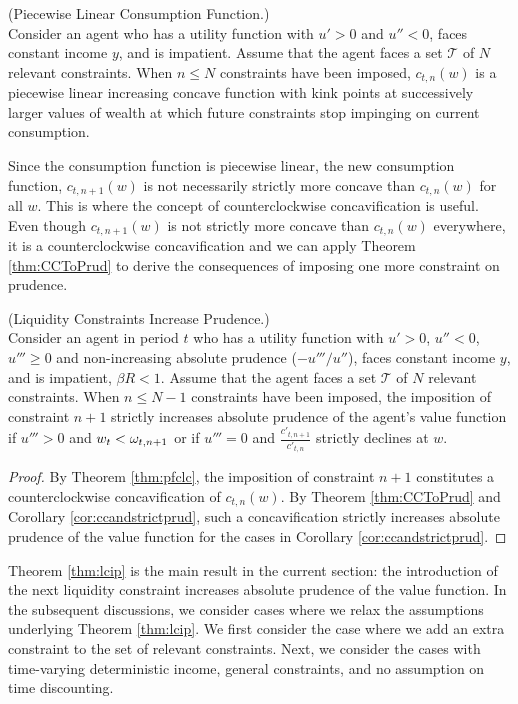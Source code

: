 \begin{corollary}(Piecewise Linear Consumption Function.) \\
	Consider an agent who has a utility function with $u'> 0$ and $u'' < 0$, faces constant income ${y}$, and is impatient. Assume that the agent faces a set $\mathcal{T}$ of $N$ relevant constraints. When $n \leq N$ constraints have been imposed, $c_{t,n}(w)$ is a piecewise linear increasing concave function with kink points at successively larger values of wealth at which future constraints stop impinging on current consumption.
\end{corollary}

Since the consumption function is piecewise linear, the new consumption function, $c_{t,n+1}(w)$ is not necessarily strictly more concave than $c_{t,n}(w)$ for all $w$. This is where the concept of counterclockwise concavification is useful. Even though $c_{t,n+1}(w)$ is not strictly more concave than $c_{t,n}(w)$ everywhere, it is a counterclockwise concavification and we can apply Theorem \ref{thm:CCToPrud} to derive the consequences of imposing one more constraint on prudence.

\begin{theorem}\label{thm:lcip} (Liquidity Constraints Increase Prudence.) \\
	Consider an agent in period $t$ who has a utility function with $u' > 0$, $u'' < 0$, $u''' \geq 0$ and non-increasing absolute prudence ($-u'''/u''$), faces constant income ${y}$, and is impatient, $\beta R < 1$. Assume that the agent faces a set $\mathcal{T}$ of $N$ relevant constraints. When $n \leq N-1$ constraints have been imposed, the imposition of constraint $n+1$ strictly increases absolute prudence of the agent's value function if $u''' > 0$ and $w_t < \omega_{t,n+1}$ or if $u''' = 0$ and $\frac{c'_{t,n+1}}{c'_{t,n}}$ strictly declines at $w$.
\end{theorem}
\begin{proof}
	By Theorem \ref{thm:pfclc}, the imposition of constraint $n+1$ constitutes a counterclockwise concavification of $c_{t,n}(w)$. By Theorem \ref{thm:CCToPrud} and Corollary \ref{cor:ccandstrictprud}, such a concavification strictly increases absolute prudence of the value function for the cases in Corollary \ref{cor:ccandstrictprud}.
\end{proof}

Theorem \ref{thm:lcip} is the main result in the current section: the introduction of the next liquidity constraint increases absolute prudence of the value function. In the subsequent discussions, we consider cases where we relax the assumptions underlying Theorem \ref{thm:lcip}. We first consider the case where we add an extra constraint to the set of relevant constraints. Next, we consider the cases with time-varying deterministic income, general constraints, and no assumption on time discounting.






